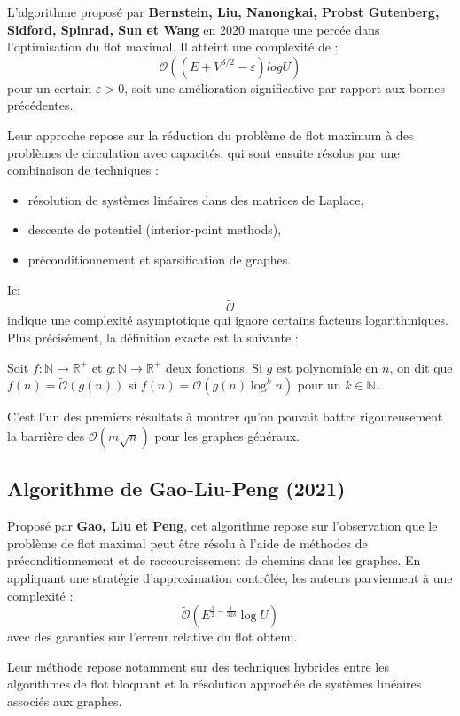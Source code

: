 \documentclass[a4paper]{article}
\begin{document}
L’algorithme proposé par \textbf{Bernstein, Liu, Nanongkai, Probst Gutenberg, Sidford, Spinrad, Sun et Wang} en 2020 marque une percée dans l’optimisation du flot maximal\cite{chen2022maximumflowminimumcostflow}. Il atteint une complexité de :
\[
\tilde{\mathcal{O}}((E+ V^{3/2} - \varepsilon)log U)
\]
pour un certain $\varepsilon > 0$, soit une amélioration significative par rapport aux bornes précédentes.

Leur approche repose sur la réduction du problème de flot maximum à des problèmes de circulation avec capacités, qui sont ensuite résolus par une combinaison de techniques :
\begin{itemize}
    \item résolution de systèmes linéaires dans des matrices de Laplace,
    \item descente de potentiel (interior-point methods),
    \item préconditionnement et sparsification de graphes.
\end{itemize}
Ici \[\tilde{\mathcal{O}}\] indique une complexité asymptotique qui ignore certains facteurs logarithmiques. Plus précisément, la définition exacte est la suivante :
\begin{definition} Soit $f: \mathbb{N} \to \mathbb{R}^+$ et $g: \mathbb{N} \to \mathbb{R}^+$ deux fonctions. Si $g$ est polynomiale en $n$, on dit que
	$f(n) = \tilde{\mathcal{O}}(g(n))$ si  $f(n) = \mathcal{O}(g(n) \log^k n)$ pour un $k \in \mathbb{N}$.
\end{definition}
C’est l’un des premiers résultats à montrer qu’on pouvait battre rigoureusement la barrière des $\mathcal{O}(m \sqrt{n})$ pour les graphes généraux.
\subsection{Algorithme de Gao-Liu-Peng (2021)}

Proposé par \textbf{Gao, Liu et Peng}, cet algorithme repose sur l’observation que le problème de flot maximal peut être résolu à l’aide de méthodes de préconditionnement et de raccourcissement de chemins dans les graphes\cite{gao2021fullydynamicelectricalflows}. En appliquant une stratégie d’approximation contrôlée, les auteurs parviennent à une complexité :
\[
\tilde{\mathcal{O}}\left(E^{\frac{3}{2} - \frac{1}{32\delta}} \log U\right)
\]
avec des garanties sur l’erreur relative du flot obtenu.

Leur méthode repose notamment sur des techniques hybrides entre les algorithmes de flot bloquant et la résolution approchée de systèmes linéaires associés aux graphes.
\end{document}
